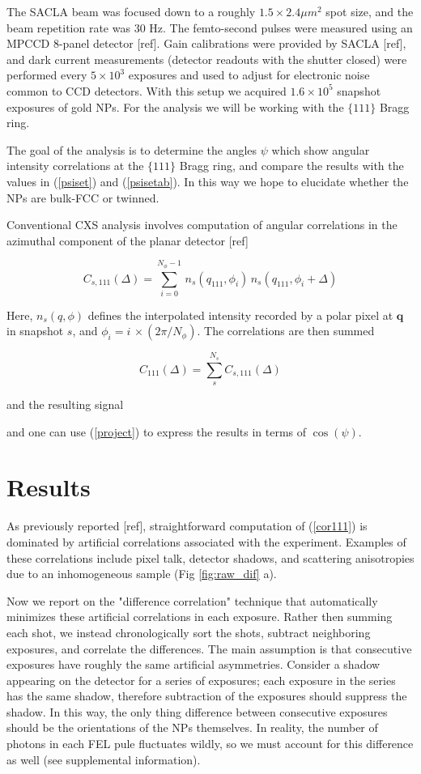 \documentclass [11pt,fleqn]{article}
\def \be {\begin{equation}}
\def \ee {\end{equation}}
\begin{document}
The SACLA beam was focused down to a roughly $1.5 \times 2.4 \mu m ^2$ spot size, and the beam repetition rate was 30 Hz. The femto-second pulses were measured using an MPCCD 8-panel detector [ref]. Gain calibrations were provided by SACLA [ref], and dark current measurements (detector readouts with the shutter closed) were performed every $5\times 10^3$ exposures and used to adjust for electronic noise common to CCD detectors. With this setup we acquired $1.6\times 10^5$ snapshot exposures of gold NPs. For the analysis we will be working with the $\{111\}$ Bragg ring.

The goal of the analysis is to determine the angles $\psi$ which show angular intensity correlations at the $\{111\}$ Bragg ring, and compare the results with the values in (\ref{psiset}) and (\ref{psisetab}). In this way we hope to elucidate whether the NPs are bulk-FCC or twinned.  

Conventional CXS analysis involves computation of angular correlations in the azimuthal component of the planar detector [ref]

\be \label{cor111}
C_{s,111}(\Delta) = \sum_{i=0} ^{N_\phi-1} \, n_s(q_{111},\phi_i)\, n_s(q_{111}, \phi_i+\Delta)
\ee

Here, $n_s(q,\phi)$ defines the interpolated intensity recorded by a polar pixel at $\bm q$ in snapshot $s$, and $\phi_i = i\,\times (2\pi/N_\phi) $. The correlations are then summed

\be
C_{111}(\Delta) = \sum_{s}^{N_s} C_{s,111}(\Delta)
\ee

and the resulting signal 

and one can use (\ref{project}) to express the results in terms of $\cos(\psi)$.

\section{Results}

As previously reported [ref], straightforward computation of (\ref{cor111}) is dominated by artificial correlations associated with the experiment. Examples of these correlations include pixel talk, detector shadows, and scattering anisotropies due to an inhomogeneous sample (Fig \ref{fig:raw_dif} a). 

Now we report on the "difference correlation" technique that automatically minimizes these artificial correlations in each exposure. Rather then summing each shot, we instead chronologically sort the shots, subtract neighboring exposures, and correlate the differences. The main assumption is that consecutive exposures have roughly the same artificial asymmetries. Consider a shadow appearing on the detector for a series of exposures; each exposure in the series has the same shadow, therefore subtraction of the exposures should  suppress the shadow. In this way, the only thing difference between consecutive exposures should be the orientations of the NPs themselves. In reality, the number of photons in each FEL pule fluctuates wildly, so we must account for this difference as well (see supplemental information).  
\end{document}
